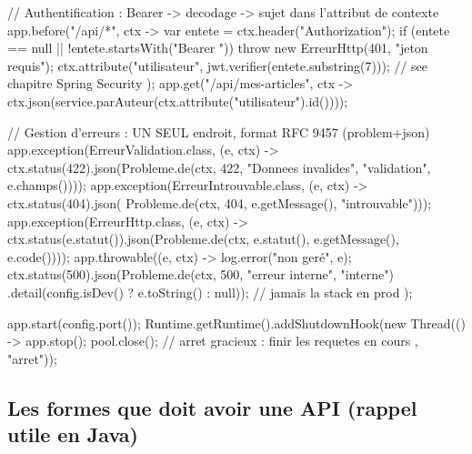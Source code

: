 \begin{codejava}
{{        // Authentification : Bearer -> decodage -> sujet dans l'attribut de contexte
        app.before("/api/*", ctx -> {
            var entete = ctx.header("Authorization");
            if (entete == null || !entete.startsWith("Bearer ")) { throw new ErreurHttp(401, "jeton requis"); }
            ctx.attribute("utilisateur", jwt.verifier(entete.substring(7)));  // see chapitre Spring Security
        });
        app.get("/api/mes-articles", ctx -> ctx.json(service.parAuteur(ctx.attribute("utilisateur").id())));

        // Gestion d'erreurs : UN SEUL endroit, format RFC 9457 (problem+json)
        app.exception(ErreurValidation.class, (e, ctx) -> ctx.status(422).json(Probleme.de(ctx, 422,
                "Donnees invalides", "validation", e.champs())));
        app.exception(ErreurIntrouvable.class, (e, ctx) -> ctx.status(404).json(
                Probleme.de(ctx, 404, e.getMessage(), "introuvable")));
        app.exception(ErreurHttp.class, (e, ctx) -> ctx.status(e.statut()).json(Probleme.de(ctx, e.statut(), e.getMessage(), e.code())));
        app.throwable((e, ctx) -> {
            log.error("non ger\'e", e);
            ctx.status(500).json(Probleme.de(ctx, 500, "erreur interne", "interne")
                    .detail(config.isDev() ? e.toString() : null));     // jamais la stack en prod
        });

        app.start(config.port());
        Runtime.getRuntime().addShutdownHook(new Thread(() -> {
            app.stop();
            pool.close();                       // arret gracieux : finir les requetes en cours
        }, "arret"));
    }
}
\end{codejava}

\subsection{Les formes que doit avoir une API (rappel utile en Java)}

